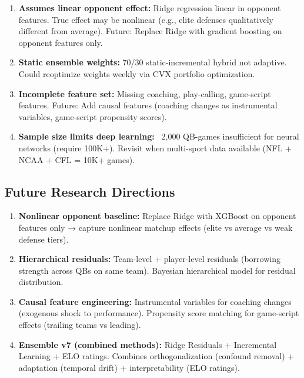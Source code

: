 \begin{enumerate}[itemsep=3pt,parsep=0pt]
    \item \textbf{Assumes linear opponent effect:} Ridge regression linear in opponent features. True effect may be nonlinear (e.g., elite defenses qualitatively different from average). Future: Replace Ridge with gradient boosting on opponent features only.

    \item \textbf{Static ensemble weights:} 70/30 static-incremental hybrid not adaptive. Could reoptimize weights weekly via CVX portfolio optimization.

    \item \textbf{Incomplete feature set:} Missing coaching, play-calling, game-script features. Future: Add causal features (coaching changes as instrumental variables, game-script propensity scores).

    \item \textbf{Sample size limits deep learning:} ~2,000 QB-games insufficient for neural networks (require 100K+). Revisit when multi-sport data available (NFL + NCAA + CFL = 10K+ games).
\end{enumerate}

\subsection{Future Research Directions}

\begin{enumerate}[itemsep=3pt,parsep=0pt]
    \item \textbf{Nonlinear opponent baseline:} Replace Ridge with XGBoost on opponent features only → capture nonlinear matchup effects (elite vs average vs weak defense tiers).

    \item \textbf{Hierarchical residuals:} Team-level + player-level residuals (borrowing strength across QBs on same team). Bayesian hierarchical model for residual distribution.

    \item \textbf{Causal feature engineering:} Instrumental variables for coaching changes (exogenous shock to performance). Propensity score matching for game-script effects (trailing teams vs leading).

    \item \textbf{Ensemble v7 (combined methods):} Ridge Residuals + Incremental Learning + ELO ratings. Combines orthogonalization (confound removal) + adaptation (temporal drift) + interpretability (ELO ratings).
\end{enumerate}

